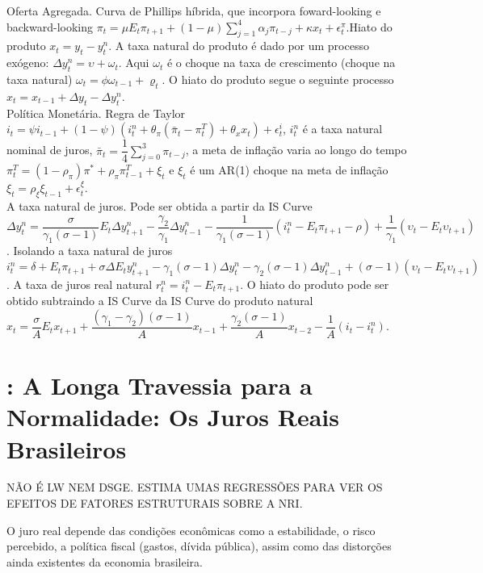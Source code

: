 Oferta Agregada. Curva de Phillips híbrida, que incorpora foward-looking e backward-looking $\pi_t = \mu E_t \pi_{t+1} + (1 - \mu) \sum_{j=1}^{4} \alpha_j \pi_{t-j} + \kappa x_t + \epsilon_t^{\pi} $.Hiato do produto $x_t = y_t - y_t^{n}$. A taxa natural do produto é dado por um processo exógeno: $\Delta y_t^{n} = \upsilon + \omega_t $. Aqui $\omega_t$ é o choque na taxa de crescimento (choque na taxa natural) $\omega_t = \phi \omega_{t-1} + \varrho_t $. O hiato do produto segue o seguinte processo $x_t = x_{t-1} + \Delta y_t - \Delta y_t^{n} $.\\

Política Monetária. Regra de Taylor $i_t = \psi i_{t-1} + (1 - \psi)(i_t^{n} + \theta_{\pi}(\bar{\pi}_t - \pi_t^{T}) + \theta_x x_t ) + \epsilon_t^{i} $, $i_t^{n}$ é a taxa natural nominal de juros, $\bar{\pi}_t = \dfrac{1}{4} \sum_{j=0}^{3} \pi_{t-j}$, a meta de inflação varia ao longo do tempo $\pi_t^{T} = (1 - \rho_{\pi}) \pi^{*} + \rho_{\pi}\pi_{t-1}^{T} + \xi_t$ e $\xi_t $ é um AR(1) choque na meta de inflação $\xi_t = \rho_{\xi}\xi_{t-1} + \epsilon_t^{\xi}$.\\

A taxa natural de juros. Pode ser obtida a partir da IS Curve $\Delta y_t^{n} = \dfrac{\sigma}{\gamma_1(\sigma -1 )}E_t \Delta y_{t+1}^{n} - \dfrac{\gamma_2}{\gamma_1}\Delta y_{t-1}^{n} - \dfrac{1}{\gamma_1 (\sigma -1)}(i_t^{n} - E_t \pi_{t+1} - \rho) + \dfrac{1}{\gamma_1}(\upsilon_t - E_t \upsilon_{t+1}) $. Isolando a taxa natural de juros $i_t^{n} = \delta + E_t \pi_{t+1} + \sigma \Delta E_t y_{t+1}^{n} - \gamma_1 (\sigma -1) \Delta y_t^{n} - \gamma_2(\sigma -1) \Delta y_{t-1}^{n} + (\sigma -1)(\upsilon_t - E_t \upsilon_{t+1}) $. A taxa de juros real natural $ r_t^{n} = i_t^{n} - E_t \pi_{t+1}$. O hiato do produto pode ser obtido subtraindo a IS Curve da IS Curve do produto natural $ x_t = \dfrac{\sigma}{A}E_t x_{t+1} + \dfrac{(\gamma_1 - \gamma_2)(\sigma -1 )}{A}x_{t-1} + \dfrac{\gamma_2(\sigma -1)}{A}x_{t-2} - \dfrac{1}{A}(i_t - i_t^{n}) $.
%
%
\section{\citet{Aurelio:2011}: A Longa Travessia para a Normalidade: Os Juros Reais Brasileiros }

NÃO É LW NEM DSGE. ESTIMA UMAS REGRESSÕES PARA VER OS EFEITOS DE FATORES ESTRUTURAIS SOBRE A NRI.

O juro real depende das condições econômicas como a estabilidade, o risco percebido, a política fiscal (gastos, dívida pública), assim como das distorções ainda existentes da economia brasileira.

